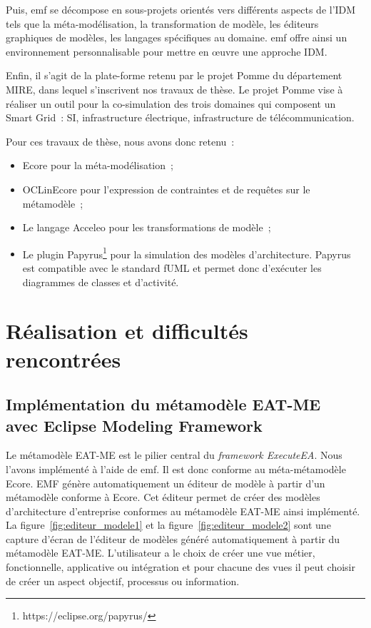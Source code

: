 Puis, \gls{emf} se décompose en sous-projets orientés vers différents aspects de
l'IDM tels que la méta-modélisation, la transformation de modèle, les éditeurs
graphiques de modèles, les langages spécifiques au domaine. \gls{emf} offre
ainsi un environnement personnalisable pour mettre en œuvre une approche IDM.

Enfin, il s'agit de la plate-forme retenu par le projet Pomme du département
MIRE, dans lequel s'inscrivent nos travaux de thèse. Le projet Pomme vise à
réaliser un outil pour la co-simulation des trois domaines qui composent un Smart
Grid~: SI, infrastructure électrique, infrastructure de télécommunication.

Pour ces travaux de thèse, nous avons donc retenu~:

\begin{itemize}

    \item Ecore pour la méta-modélisation~;

    \item OCLinEcore pour l'expression de contraintes et de requêtes sur le métamodèle~;

    \item Le langage Acceleo pour les transformations de modèle~;

    \item Le plugin Papyrus\footnote{https://eclipse.org/papyrus/} pour la simulation
    des modèles d'architecture. Papyrus est compatible avec le standard fUML et
    permet donc d'exécuter les diagrammes de classes et d'activité. 

\end{itemize}


\section{Réalisation et difficultés rencontrées}
\label{sec:realisation_difficultes}
    \subsection{Implémentation du métamodèle EAT-ME \\
                avec Eclipse Modeling Framework}

    Le métamodèle EAT-ME est le pilier central du \emph{framework ExecuteEA}. Nous
    l'avons implémenté à l'aide de \gls{emf}. Il est donc conforme au méta-métamodèle Ecore. EMF génère automatiquement un éditeur de modèle à partir
    d'un métamodèle conforme à Ecore. Cet éditeur permet de créer des modèles
    d'architecture d'entreprise conformes au métamodèle EAT-ME ainsi implémenté.
    La figure~\ref{fig:editeur_modele1} et la figure~\ref{fig:editeur_modele2}
    sont une capture d'écran de l'éditeur de modèles généré automatiquement à
    partir du métamodèle EAT-ME. L'utilisateur a le choix de créer une vue métier,
    fonctionnelle, applicative ou intégration et pour chacune des vues il peut
    choisir de créer un aspect objectif, processus ou information.


